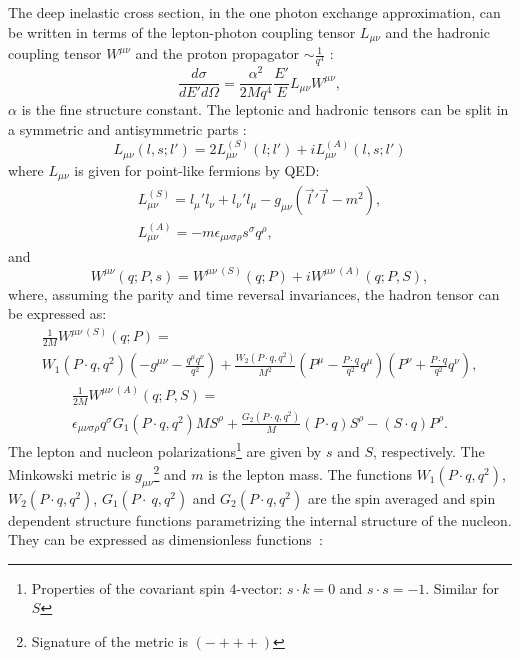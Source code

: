 The deep inelastic cross section, in the one photon exchange approximation, can be written in terms of the lepton-photon coupling tensor $L_{\mu\nu}$ and the hadronic coupling tensor $W^{\mu\nu}$ and the proton propagator $\sim \frac{1}{q^4}$ \cite{AEL}:
%
\begin{equation}
  \frac{d\sigma}{dE'd\Omega} = \frac{\alpha^2}{2Mq^4}\frac{E'}{E}L_{\mu\nu}W^{\mu\nu},
  \label{eq:coupling}
\end{equation}
%
$\alpha$ is the fine structure constant. The leptonic and hadronic tensors can be split in a symmetric and antisymmetric parts \cite{SchoolFermi}:
%
\begin{equation}
  L_{\mu\nu}(l,s;l') = 2{L^{(S)}_{\mu\nu}(l;l')+iL^{(A)}_{\mu\nu}(l,s;l')}
\end{equation}
%
where $L_{\mu\nu}$ is given for point-like fermions by QED:
%
\begin{equation}
  \begin{split}
    L^{(S)}_{\mu\nu} = l_{\mu}'l_{\nu} + l_{\nu}'l_{\mu} - g_{\mu\nu}(\vec{l}'\vec{l}-m^2), \\
    L^{(A)}_{\mu\nu} = -m\epsilon_{\mu\nu\sigma\rho}s^{\sigma}q^{\rho},
  \end{split}
\end{equation}
%
and
%
\begin{equation}
  W^{\mu\nu}(q;P,s) = W^{\mu\nu\ (S)}(q;P) + iW^{\mu\nu\ (A)}(q;P,S),
\end{equation}
%
where, assuming the parity and time reversal invariances, the hadron tensor can be expressed as:
%
\begin{equation}
  \begin{split}
    \frac{1}{2M}W^{\mu\nu\ (S)}(q;P) = \\
    W_1(P\cdot q,q^2)\left(-g^{\mu\nu}-\frac{q^{\mu}q^{\nu}}{q^2}\right)+\frac{W_2(P\cdot q,q^2)}{M^2}\left(P^{\mu}-\frac{P\cdot q}{q^2}q^{\mu}\right)\left(P^{\nu}+\frac{P\cdot q}{q^2}q^{\nu}\right),
  \end{split}
\end{equation}
%
\begin{equation}
  \begin{split}
    \frac{1}{2M}W^{\mu\nu\ (A)}(q;P,S) = \\
    \epsilon_{\mu\nu\sigma\rho}q^{\sigma}{G_1(P\cdot q,q^2)MS^{\rho}+\frac{G_2(P\cdot q,q^2)}{M}(P\cdot q)S^{\rho}-(S\cdot q)P^{\rho}}.
  \end{split}
\end{equation}
%
The lepton and nucleon polarizations\footnote{Properties of the covariant spin $4$-vector: $s \cdot k = 0$ and $s \cdot s = -1$. Similar for $S$} are given by $s$ and $S$, respectively. The Minkowski metric is $g_{\mu\nu}$\footnote{Signature of the metric is $(-+++)$} and $m$ is the lepton mass. The functions $W_1(P \cdot q,q^2)$, $W_2(P\cdot q,q^2)$, $G_1(P\cdot~q,q^2)$ and $G_2(P\cdot q,q^2)$ are the spin averaged and spin dependent structure functions parametrizing the internal structure of the nucleon. They can be expressed as dimensionless functions~:
